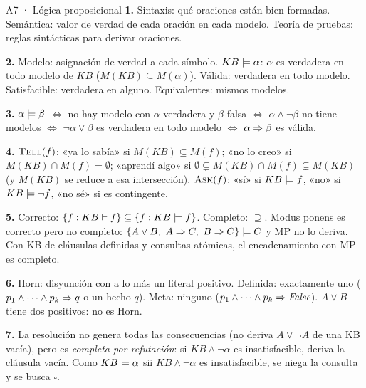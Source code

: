 \begin{solucion}{A7 · Lógica proposicional}
\textbf{1.} Sintaxis: qué oraciones están bien formadas. Semántica: valor de verdad de cada oración en
cada modelo. Teoría de pruebas: reglas sintácticas para derivar oraciones.

\textbf{2.} Modelo: asignación de verdad a cada símbolo. $KB\models\alpha$: $\alpha$ es verdadera en todo
modelo de $KB$ ($M(KB)\subseteq M(\alpha)$). Válida: verdadera en todo modelo. Satisfacible: verdadera
en alguno. Equivalentes: mismos modelos.

\textbf{3.} $\alpha\models\beta$ $\iff$ no hay modelo con $\alpha$ verdadera y $\beta$ falsa $\iff$
$\alpha\wedge\neg\beta$ no tiene modelos $\iff$ $\neg\alpha\vee\beta$ es verdadera en todo modelo $\iff$
$\alpha\Rightarrow\beta$ es válida.

\textbf{4.} $\textsc{Tell}(f)$: «ya lo sabía» si $M(KB)\subseteq M(f)$; «no lo creo» si
$M(KB)\cap M(f)=\emptyset$; «aprendí algo» si $\emptyset\subsetneq M(KB)\cap M(f)\subsetneq M(KB)$ (y
$M(KB)$ se reduce a esa intersección). $\textsc{Ask}(f)$: «sí» si $KB\models f$, «no» si $KB\models\neg f$,
«no sé» si es contingente.

\textbf{5.} Correcto: $\{f:KB\vdash f\}\subseteq\{f:KB\models f\}$. Completo: $\supseteq$. Modus ponens es
correcto pero no completo: $\{A\vee B,\ A\Rightarrow C,\ B\Rightarrow C\}\models C$ y MP no lo deriva. Con KB de
cláusulas definidas y consultas atómicas, el encadenamiento con MP es completo.

\textbf{6.} Horn: disyunción con a lo más un literal positivo. Definida: exactamente uno
($p_1\wedge\dots\wedge p_k\Rightarrow q$ o un hecho $q$). Meta: ninguno ($p_1\wedge\dots\wedge p_k\Rightarrow\textit{False}$).
$A\vee B$ tiene dos positivos: no es Horn.

\textbf{7.} La resolución no genera todas las consecuencias (no deriva $A\vee\neg A$ de una KB vacía),
pero es \emph{completa por refutación}: si $KB\wedge\neg\alpha$ es insatisfacible, deriva la cláusula
vacía. Como $KB\models\alpha$ sii $KB\wedge\neg\alpha$ es insatisfacible, se niega la consulta y se busca $\square$.
\end{solucion}

